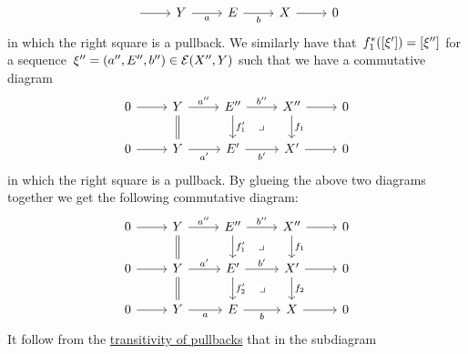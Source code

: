\begin{remark}
\begin{enumerate}
\[\begin{tikzcd}
            \arrow{r}
          & Y
            \arrow{r}[below]{a}
          & E
            \arrow{r}[below]{b}
          & X
            \arrow{r}
          & 0
        \end{tikzcd}
      \]
      in which the right square is a pullback.
      We similarly have that~$f_1^*( [\xi'] ) = [\xi'']$ for a sequence~$\xi'' = (a'', E'', b'') \in \mathcal{E}(X'', Y)$ such that we have a commutative diagram
      \[
        \begin{tikzcd}
            0
            \arrow{r}
          & Y
            \arrow{r}[above]{a''}
            \arrow[equal]{d}
          & E''
            \arrow{r}[above]{b''}
            \arrow{d}[right]{f'_1}
            \arrow[phantom]{dr}[description]{\pb}
          & X''
            \arrow{r}
            \arrow{d}[right]{f_1}
          & 0
          \\
            0
            \arrow{r}
          & Y
            \arrow{r}[below]{a'}
          & E'
            \arrow{r}[below]{b'}
          & X'
            \arrow{r}
          & 0
        \end{tikzcd}
      \]
      in which the right square is a pullback.
      By glueing the above two diagrams together we get the following commutative diagram:
      \[
        \begin{tikzcd}
            0
            \arrow{r}
          & Y
            \arrow{r}[above]{a''}
            \arrow[equal]{d}
          & E''
            \arrow{r}[above]{b''}
            \arrow{d}[right]{f'_1}
            \arrow[phantom]{dr}[description]{\pb}
          & X''
            \arrow{r}
            \arrow{d}[right]{f_1}
          & 0
          \\
            0
            \arrow{r}
          & Y
            \arrow{r}[above]{a'}
            \arrow[equal]{d}
          & E'
            \arrow{r}[above]{b'}
            \arrow{d}[right]{f'_2}
            \arrow[phantom]{dr}[description]{\pb}
          & X'
            \arrow{r}
            \arrow{d}[right]{f_2}
          & 0
          \\
            0
            \arrow{r}
          & Y
            \arrow{r}[below]{a}
          & E
            \arrow{r}[below]{b}
          & X
            \arrow{r}
          & 0
        \end{tikzcd}
      \]
      It follow from the \hyperref[transitivity of pullback and pushout]{transitivity of pullbacks} that in the subdiagram
      \[
        \begin{tikzcd}[column sep = large]

\end{tikzcd}\]
\end{enumerate}
\end{remark}
